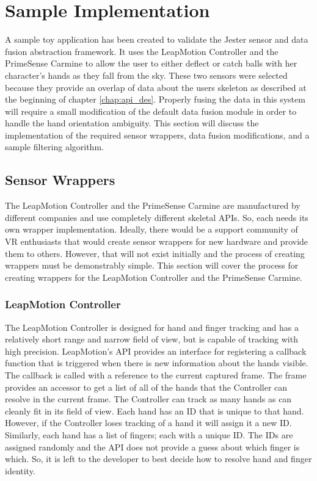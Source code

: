 \chapter{Sample Implementation}\label{chap:sample_app}

A sample toy application has been created to validate the Jester sensor and data fusion abstraction framework. It uses the LeapMotion Controller and the PrimeSense Carmine to allow the user to either deflect or catch balls with her character's hands as they fall from the sky. These two sensors were selected because they provide an overlap of data about the users skeleton as described at the beginning of chapter \ref{chap:api_des}. Properly fusing the data in this system will require a small modification of the default data fusion module in order to handle the hand orientation ambiguity. This section will discuss the implementation of the required sensor wrappers, data fusion modifications, and a sample filtering algorithm.

\section{Sensor Wrappers}

The LeapMotion Controller and the PrimeSense Carmine are manufactured by different companies and use completely different skeletal APIs. So, each needs its own wrapper implementation. Ideally, there would be a support community of VR enthusiasts that would create sensor wrappers for new hardware and provide them to others. However, that will not exist initially and the process of creating wrappers must be demonstrably simple. This section will cover the process for creating wrappers for the LeapMotion Controller and the PrimeSense Carmine.

\subsection{LeapMotion Controller}\label{sec:leap_impl}

The LeapMotion Controller is designed for hand and finger tracking and has a relatively short range and narrow field of view, but is capable of tracking with high precision. LeapMotion's API provides an interface for registering a callback function that is triggered when there is new information about the hands visible. The callback is called with a reference to the current captured frame. The frame provides an accessor to get a list of all of the hands that the Controller can resolve in the current frame. The Controller can track as many hands as can cleanly fit in its field of view. Each hand has an ID that is unique to that hand. However, if the Controller loses tracking of a hand it will assign it a new ID. Similarly, each hand has a list of fingers; each with a unique ID. The IDs are assigned randomly and the API does not provide a guess about which finger is which. So, it is left to the developer to best decide how to resolve hand and finger identity.

